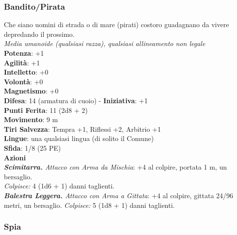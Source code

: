 \begin{multicols}{2}
\subsubsection{Bandito/Pirata}
Che siano uomini di strada o di mare (pirati) costoro guadagnano da vivere depredando il prossimo.\\
\emph{Media umanoide (qualsiasi razza), qualsiasi allineamento non legale}\\
\textbf{Potenza}: +1\\
\textbf{Agilità}: +1\\
\textbf{Intelletto}: +0\\
\textbf{Volontà}: +0\\
\textbf{Magnetismo}: +0\\
\textbf{Difesa}: 14 (armatura di cuoio) - \textbf{Iniziativa}: +1\\
\textbf{Punti Ferita}: 11 (2d8 + 2)\\
\textbf{Movimento}: 9 m\\
\textbf{Tiri Salvezza}: Tempra +1, Riflessi +2, Arbitrio +1 \\
\textbf{Lingue}: una qualsiasi lingua (di solito il Comune)\\
\textbf{Sfida}: 1/8 (25 PE)\smallskip\\
\smallskip\textbf{Azioni}\\
\emph{\textbf{Scimitarra.} Attacco con Arma da Mischia}: +4 al colpire, portata 1 m, un bersaglio.\\
\emph{Colpisce:} 4 (1d6 + 1) danni taglienti.\\
\emph{\textbf{Balestra Leggera.} Attacco con Arma a Gittata}: +4 al colpire, gittata 24/96 metri, un bersaglio. \emph{Colpisce:} 5 (1d8 + 1) danni taglienti.\\

\subsubsection{Spia}


\end{multicols}
